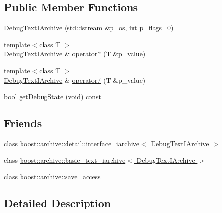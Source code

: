 \subsection*{Public Member Functions}
\begin{DoxyCompactItemize}
\item 
\hyperlink{classxtd_1_1serializer_1_1DebugTextIArchive_a97b036aced6a2612a505bca126b8e4da}{Debug\-Text\-I\-Archive} (std\-::istream \&p\-\_\-os, int p\-\_\-flags=0)
\item 
{\footnotesize template$<$class T $>$ }\\\hyperlink{classxtd_1_1serializer_1_1DebugTextIArchive}{Debug\-Text\-I\-Archive} \& \hyperlink{classxtd_1_1serializer_1_1DebugTextIArchive_a7fb53e65348749bad9e2b945b03c1e9a}{operator$\ast$} (T \&p\-\_\-value)
\item 
{\footnotesize template$<$class T $>$ }\\\hyperlink{classxtd_1_1serializer_1_1DebugTextIArchive}{Debug\-Text\-I\-Archive} \& \hyperlink{classxtd_1_1serializer_1_1DebugTextIArchive_a8c9fb4b382705609a5cd1570c63818f1}{operator/} (T \&p\-\_\-value)
\item 
bool \hyperlink{classxtd_1_1serializer_1_1DebugTextIArchive_a3ad42e3b468f60546bc76b21247ee0ca}{get\-Debug\-State} (void) const 
\end{DoxyCompactItemize}
\subsection*{Friends}
\begin{DoxyCompactItemize}
\item 
class \hyperlink{classxtd_1_1serializer_1_1DebugTextIArchive_af9e30d7c11da39f8fdf5fd8c21e4e831}{boost\-::archive\-::detail\-::interface\-\_\-iarchive$<$ Debug\-Text\-I\-Archive $>$}
\item 
class \hyperlink{classxtd_1_1serializer_1_1DebugTextIArchive_a6fe2ce7d54600795abdea507c1270a7a}{boost\-::archive\-::basic\-\_\-text\-\_\-iarchive$<$ Debug\-Text\-I\-Archive $>$}
\item 
class \hyperlink{classxtd_1_1serializer_1_1DebugTextIArchive_aaca003bb8a4fc59424e4025130da4edd}{boost\-::archive\-::save\-\_\-access}
\end{DoxyCompactItemize}


\subsection{Detailed Description}


